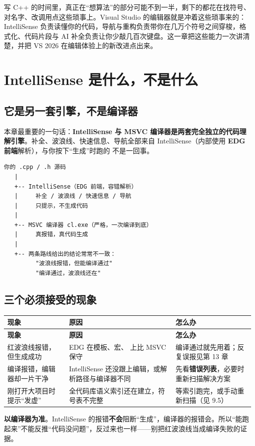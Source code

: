 
写 C++ 的时间里，真正在“想算法”的部分可能不到一半，剩下的都花在找符号、对名字、改调用点这些琐事上。Visual Studio 的编辑器就是冲着这些琐事来的：IntelliSense 负责读懂你的代码，导航与重构负责带你在几万个符号之间穿梭，格式化、代码片段与 AI 补全负责让你少敲几百次键盘。这一章把这些能力一次讲清楚，并把 VS 2026 在编辑体验上的新改进点出来。

\section{IntelliSense 是什么，不是什么}

\subsection{它是另一套引擎，不是编译器}

本章最重要的一句话：\textbf{IntelliSense 与 MSVC 编译器是两套完全独立的代码理解引擎}。补全、波浪线、快速信息、导航全部来自 IntelliSense（内部使用 \textbf{EDG 前端}解析），与你按下“生成”时跑的  不是一回事。

\begin{lstlisting}[style=textstyle]
你的 .cpp / .h 源码
   |
   +-- IntelliSense（EDG 前端，容错解析）
   |     补全 / 波浪线 / 快速信息 / 导航
   |     只提示，不生成代码
   |
   +-- MSVC 编译器 cl.exe（严格，一次编译到底）
   |     真报错，真代码生成
   |
   +-- 两条路线给出的结论常常不一致：
         "波浪线报错，但能编译通过"
         "编译通过，波浪线还在"
\end{lstlisting}
\subsection{三个必须接受的现象}

\begin{longtable}{L{4.4cm}L{6.2cm}L{4.0cm}}\toprule
\textbf{现象} & \textbf{原因} & \textbf{怎么办} \\ \midrule \endfirsthead
\toprule \textbf{现象} & \textbf{原因} & \textbf{怎么办} \\ \midrule \endhead \bottomrule \endlastfoot
红波浪线报错，但生成成功 & EDG 在模板、宏、 上比 MSVC 保守 & 编译通过就先用着；反复误报见第 13 章 \\
编译报错，编辑器却一片干净 & IntelliSense 还没跟上编辑，或解析路径与编译器不同 & 先看\textbf{错误列表}，必要时重新扫描解决方案 \\
刚打开大项目时提示“发虚” & 全代码库语义索引还在建立，符号表不完整 & 等索引跑完，或手动重新扫描（见 9.5） \\
\end{longtable}
\begin{warnbox}[注意]
\textbf{以编译器为准}。IntelliSense 的报错\textbf{不会}阻断“生成”，编译器的报错会。所以“能跑起来”不能反推“代码没问题”，反过来也一样——别把红波浪线当成编译失败的证据。
\end{warnbox}

